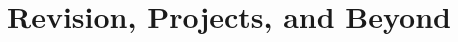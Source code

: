 \documentclass[12pt, a4paper, twoside, openany]{book}
\begin{document}







\part{Revision, Projects, and Beyond}







\backmatter




\end{document}
